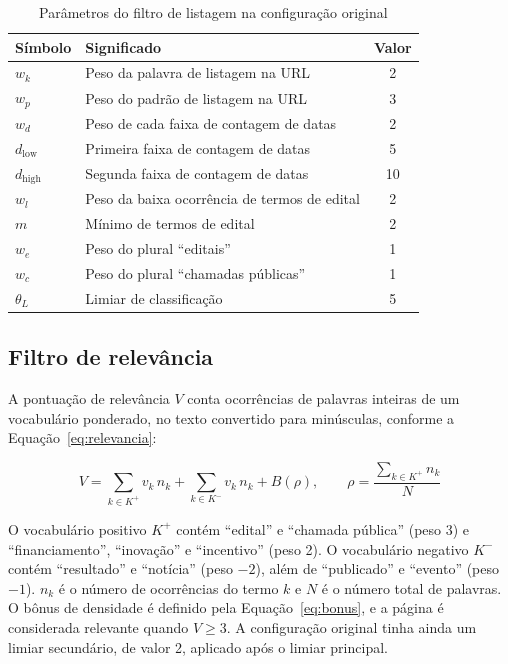 \begin{table}[htbp]
\centering
\caption{Parâmetros do filtro de listagem na configuração original}
\label{tab:listagem_original}
\small
\begin{tabular}{l l c}
\toprule
Símbolo & Significado & Valor \\
\midrule
$w_k$               & Peso da palavra de listagem na URL      & 2 \\
$w_p$               & Peso do padrão de listagem na URL       & 3 \\
$w_d$               & Peso de cada faixa de contagem de datas & 2 \\
$d_{\mathrm{low}}$  & Primeira faixa de contagem de datas     & 5 \\
$d_{\mathrm{high}}$ & Segunda faixa de contagem de datas      & 10 \\
$w_l$               & Peso da baixa ocorrência de termos de edital & 2 \\
$m$                 & Mínimo de termos de edital              & 2 \\
$w_e$               & Peso do plural ``editais''              & 1 \\
$w_c$               & Peso do plural ``chamadas públicas''    & 1 \\
$\theta_L$          & Limiar de classificação                 & 5 \\
\bottomrule
\end{tabular}
\end{table}

\subsection{Filtro de relevância}
\label{subsec:relevancia}

A pontuação de relevância $V$ conta ocorrências de palavras inteiras de um
vocabulário ponderado, no texto convertido para minúsculas, conforme a
Equação~\eqref{eq:relevancia}:

\begin{equation}
\label{eq:relevancia}
V = \sum_{k \in K^{+}} v_k\, n_k + \sum_{k \in K^{-}} v_k\, n_k + B(\rho),
\qquad
\rho = \frac{\sum_{k \in K^{+}} n_k}{N}
\end{equation}

O vocabulário positivo $K^{+}$ contém ``edital'' e ``chamada pública''
(peso 3) e ``financiamento'', ``inovação'' e ``incentivo'' (peso 2). O
vocabulário negativo $K^{-}$ contém ``resultado'' e ``notícia'' (peso $-2$),
além de ``publicado'' e ``evento'' (peso $-1$). $n_k$ é o número de
ocorrências do termo $k$ e $N$ é o número total de palavras. O bônus de
densidade é definido pela Equação~\eqref{eq:bonus}, e a página é considerada
relevante quando $V \geq 3$. A configuração original tinha ainda um limiar
secundário, de valor 2, aplicado após o limiar principal.

